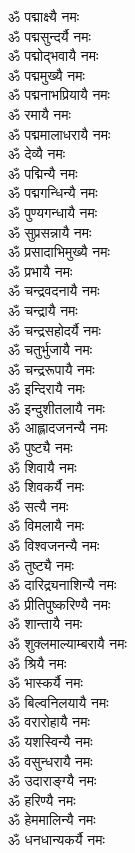\begin{multicols}{2}
\begin{flushleft}
ॐ पद्माक्ष्यै नमः\\
ॐ पद्मसुन्दर्यै नमः\\
ॐ पद्मोद्भवायै नमः\\
ॐ पद्ममुख्यै नमः\\
ॐ पद्मनाभप्रियायै नमः\\
ॐ रमायै नमः\\
ॐ पद्ममालाधरायै नमः\\
ॐ देव्यै नमः\\
ॐ पद्मिन्यै नमः\hfill{}\\
ॐ पद्मगन्धिन्यै नमः\\
ॐ पुण्यगन्धायै नमः\\
ॐ सुप्रसन्नायै नमः\\
ॐ प्रसादाभिमुख्यै नमः\\
ॐ प्रभायै नमः\\
ॐ चन्द्रवदनायै नमः\\
ॐ चन्द्रायै नमः\\
ॐ चन्द्रसहोदर्यै नमः\\
ॐ चतुर्भुजायै नमः\\
ॐ चन्द्ररूपायै नमः\hfill{}\\
ॐ इन्दिरायै नमः\\
ॐ इन्दुशीतलायै नमः\\
ॐ आह्लादजनन्यै नमः\\
ॐ पुष्ट्यै नमः\\
ॐ शिवायै नमः\\
ॐ शिवकर्यै नमः\\
ॐ सत्यै नमः\\
ॐ विमलायै नमः\\
ॐ विश्वजनन्यै नमः\\
ॐ तुष्ट्यै नमः\hfill{}\\
ॐ दारिद्र्यनाशिन्यै नमः\\
ॐ प्रीतिपुष्करिण्यै नमः\\
ॐ शान्तायै नमः\\
ॐ शुक्लमाल्याम्बरायै नमः\\
ॐ श्रियै नमः\\
ॐ भास्कर्यै नमः\\
ॐ बिल्वनिलयायै नमः\\
ॐ वरारोहायै नमः\\
ॐ यशस्विन्यै नमः\\
ॐ वसुन्धरायै नमः\hfill{}\\
ॐ उदाराङ्ग्यै नमः\\
ॐ हरिण्यै नमः\\
ॐ हेममालिन्यै नमः\\
ॐ धनधान्यकर्यै नमः\\

\end{flushleft}
\end{multicols}

